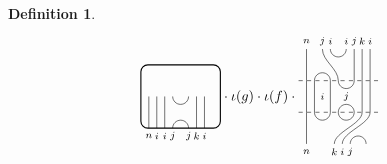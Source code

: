 \documentclass[11pt]{article}
\theoremstyle{plain}
\theoremstyle{definition}
\newtheorem{defn}[thm]{Definition}
\begin{document}
\begin{defn}
\begin{align*}
\begin{tikzpicture}[baseline=.3cm]
\begin{scope}[shift={(0,-.4)}]
    \draw (.2,0) -- (.2,.8);
    \node at (.2,-.2) {\scriptsize{$n$}};
    \draw (.4,0) -- (.4,.8);
    \node at (.4,-.2) {\scriptsize{$i$}};
    \draw (.6,0) -- (.6,.8);
    \node at (.6,-.2) {\scriptsize{$i$}};
    \draw (.8,.8) arc (-180:0:.2cm); %
    \draw (.8,0) arc (180:0:.2cm);
    \node at (.8,-.2) {\scriptsize{$j$}};
    \node at (1.2,-.2) {\scriptsize{$j$}};
    \draw (1.4,0) -- (1.4,.8);
    \node at (1.4,-.2) {\scriptsize{$k$}};
    \draw (1.6,0) -- (1.6,.8);
    \node at (1.6,-.2) {\scriptsize{$i$}};
   \end{scope}
   \draw[thick, rounded corners = 5pt] (0,-.4) rectangle (2,1.2);
  \end{tikzpicture}
  \cdot\iota(g)\cdot\iota(f)\cdot
  \begin{tikzpicture}[baseline=.3cm]
   \begin{scope}[shift={(0,.8)}]
    \draw (.2,0) -- (.2,.8);
    \node at (.2,1) {\scriptsize{$n$}};
    \draw (.6,.8) .. controls ++(-90:.3cm) and ++ (-270:.3cm) .. (1,0);
    \node at (.6,1) {\scriptsize{$j$}};
    \draw (.8,.8) arc (-180:0:.2cm);
    \node at (.8,1) {\scriptsize{$i$}};
    \node at (1.2,1) {\scriptsize{$i$}};
    \draw (.4,0) arc (180:0:.2cm); %
    \draw (1.4,0) -- (1.4,.8);
    \node at (1.4,1) {\scriptsize{$j$}};
    \draw (1.6,0) -- (1.6,.8);
    \node at (1.6,1) {\scriptsize{$k$}};
    \draw (1.8,0) -- (1.8,.8);
    \node at (1.8,1) {\scriptsize{$i$}};
    \draw[dashed] (0,0) -- (2,0);
   \end{scope}
   \begin{scope}[shift={(0,0)}]
    \draw (.2,0) -- (.2,.8); %
    \draw (.4,0) -- (.4,.8); %
    \draw (.8,0) -- (.8,.8); %
    \node at (.6,.4) {\scriptsize{$i$}}; %
    \draw (1,.8) arc (-180:0:.2cm); %
    \draw (1,0) arc(180:0:.2cm);
    \node at (1.2,.4) {\scriptsize{$j$}}; %
    \draw (1.6,0) -- (1.6,.8); %
    \draw (1.8,0) -- (1.8,.8); %
    \draw[dashed] (0,0) -- (2,0);
   \end{scope}
   \begin{scope}[shift={(0,-.8)}]
    \draw (.2,0) -- (.2,.8);
    \node at (.2,-.2) {\scriptsize{$n$}};
    \draw (.4,.8) arc (-180:0:.2cm); %
    \draw (1,.8) arc (-180:0:.2cm); %
    \draw (1.6,.8) .. controls ++(-90:.3cm) and ++(-270:.3cm) .. (.9,0);
    \node at (.9,-.2) {\scriptsize{$k$}};
    \draw (1.8,.8) .. controls ++(-90:.3cm) and ++(-270:.3cm) .. (1.1,0);
    \node at (1.1,-.2) {\scriptsize{$i$}};
    \draw (1.3,0) arc (180:0:.2cm);
    \node at (1.3,-.2) {\scriptsize{$j$}};

\end{scope}
\end{tikzpicture}
\end{align*}
\end{defn}
\end{document}

